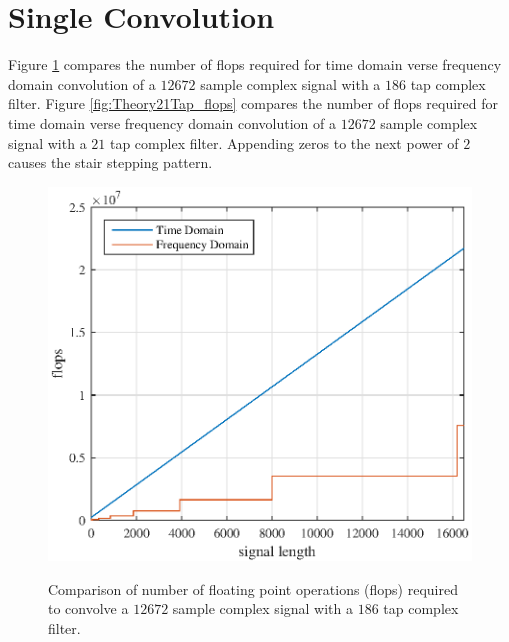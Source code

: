 \section{Single Convolution}
\label{sec:cuda_convolution_single}
Figure \ref{fig:Theory186Tap_flops} compares the number of flops required for time domain verse frequency domain convolution of a $12672$ sample complex signal with a $186$ tap complex filter.
Figure \ref{fig:Theory21Tap_flops} compares the number of flops required for time domain verse frequency domain convolution of a $12672$ sample complex signal with a $21$ tap complex filter.
Appending zeros to the next power of $2$ causes the stair stepping pattern.
\begin{figure}
	\caption{Comparison of number of floating point operations (flops) required to convolve a $12672$ sample complex signal with a $186$ tap complex filter.}
	\centering\includegraphics[width=5in]{figures/gpu_intro/Theory186Tap_flops.eps}
	\label{fig:Theory186Tap_flops}
\end{figure}

